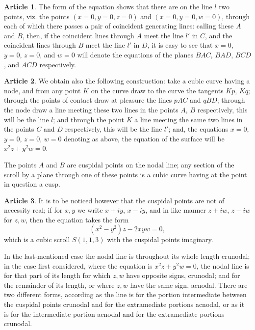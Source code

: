 \documentclass[12pt,a4paper]{article}
\theoremstyle{definition}
\newtheorem{art}{Article}[section]
\begin{document}
\begin{art}
The form of the equation shows that there are on the line $l$ two points, viz. the points $(x = 0, y = 0, z = 0)$ and $(x = 0, y = 0, w = 0)$, through each of which there passes a pair of coincident generating lines: calling these $A$ and $B$, then, if the coincident lines through $A$ meet the line $l'$ in $C$, and the coincident lines through $B$ meet the line $l'$ in $D$, it is easy to see that $x = 0$, $y = 0$, $z = 0$, and $w = 0$ will denote the equations of the planes $BAC$, $BAD$, $BCD$, and $ACD$ respectively.
\end{art}

\begin{art}
We obtain also the following construction: take a cubic curve having a node, and from any point $K$ on the curve draw to the curve the tangents $Kp$, $Kq$; through the points of contact draw at pleasure the lines $pAC$ and $qBD$; through the node draw a line meeting these two lines in the points $A$, $B$ respectively, this will be the line $l$; and through the point $K$ a line meeting the same two lines in the points $C$ and $D$ respectively, this will be the line $l'$; and, the equations $x = 0$, $y = 0$, $z = 0$, $w = 0$ denoting as above, the equation of the surface will be $x^2 z + y^2 w = 0$.

The points $A$ and $B$ are cuspidal points on the nodal line; any section of the scroll by a plane through one of these points is a cubic curve having at the point in question a cusp.
\end{art}

\begin{art}
It is to be noticed however that the cuspidal points are not of necessity real; if for $x, y$ we write $x + iy$, $x - iy$, and in like manner $z + iw$, $z - iw$ for $z, w$, then the equation takes the form
\[
(x^2 - y^2)z - 2xyw = 0,
\]
which is a cubic scroll $S(1, 1, 3)$ with the cuspidal points imaginary.

In the last-mentioned case the nodal line is throughout its whole length crunodal; in the case first considered, where the equation is $x^2 z + y^2 w = 0$, the nodal line is for that part of its length for which $z, w$ have opposite signs, crunodal; and for the remainder of its length, or where $z, w$ have the same sign, acnodal. There are two different forms, according as the line is for the portion intermediate between the cuspidal points crunodal and for the extramediate portions acnodal, or as it is for the intermediate portion acnodal and for the extramediate portions crunodal.
\end{art}
\end{document}

